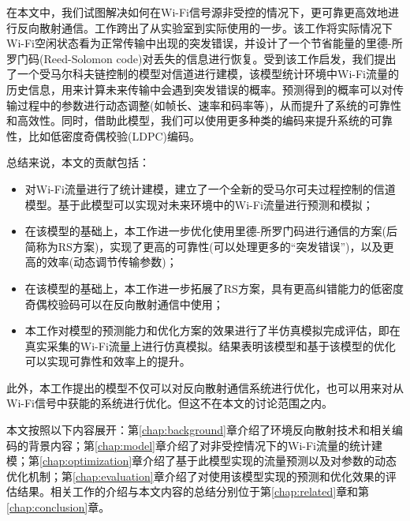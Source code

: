 
在本文中，我们试图解决如何在Wi-Fi信号源非受控的情况下，更可靠更高效地进行反向散射通信。工作\cite{OFFB}跨出了从实验室到实际使用的一步。该工作将实际情况下Wi-Fi空闲状态看为正常传输中出现的突发错误，并设计了一个节省能量的里德-所罗门码(Reed-Solomon code)对丢失的信息进行恢复。受到该工作启发，我们提出了一个受马尔科夫链控制的模型对信道进行建模，该模型统计环境中Wi-Fi流量的历史信息，用来计算未来传输中会遇到突发错误的概率。预测得到的概率可以对传输过程中的参数进行动态调整(如帧长、速率和码率等)，从而提升了系统的可靠性和高效性。同时，借助此模型，我们可以使用更多种类的编码来提升系统的可靠性，比如低密度奇偶校验(LDPC)编码。


总结来说，本文的贡献包括：

\begin{itemize}
	\item 对Wi-Fi流量进行了统计建模，建立了一个全新的受马尔可夫过程控制的信道模型。基于此模型可以实现对未来环境中的Wi-Fi流量进行预测和模拟；
	
	\item 在该模型的基础上，本工作进一步优化使用里德-所罗门码进行通信的方案(后简称为RS方案)，实现了更高的可靠性(可以处理更多的“突发错误”)，以及更高的效率(动态调节传输参数)；
	
	\item 在该模型的基础上，本工作进一步拓展了RS方案，具有更高纠错能力的低密度奇偶校验码可以在反向散射通信中使用；
	
	\item 本工作对模型的预测能力和优化方案的效果进行了半仿真模拟完成评估，即在真实采集的Wi-Fi流量上进行仿真模拟。结果表明该模型和基于该模型的优化可以实现可靠性和效率上的提升。
\end{itemize}

此外，本工作提出的模型不仅可以对反向散射通信系统进行优化，也可以用来对从Wi-Fi信号中获能的系统进行优化。但这不在本文的讨论范围之内。

本文按照以下内容展开：第\ref{chap:background}章介绍了环境反向散射技术和相关编码的背景内容；第\ref{chap:model}章介绍了对非受控情况下的Wi-Fi流量的统计建模；第\ref{chap:optimization}章介绍了基于此模型实现的流量预测以及对参数的动态优化机制；第\ref{chap:evaluation}章介绍了对使用该模型实现的预测和优化效果的评估结果。相关工作的介绍与本文内容的总结分别位于第\ref{chap:related}章和第\ref{chap:conclusion}章。
